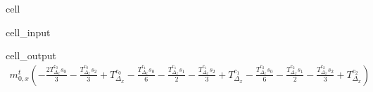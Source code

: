 \documentclass[letterpaper,10pt,english,openany,oneside]{jupyterBook}
\begin{document}
\begin{sphinxuseclass}{cell}
\begin{sphinxVerbatimInput}
\begin{sphinxuseclass}{cell_input}
\end{sphinxuseclass}\end{sphinxVerbatimInput}
\begin{sphinxVerbatimOutput}

\begin{sphinxuseclass}{cell_output}\begin{equation*}
\begin{split}\displaystyle m_{0,x}^{t} \left(- \frac{2 T_{\Delta_{x}}^{c_{0}} s_{0}}{3} - \frac{T_{\Delta_{x}}^{c_{0}} s_{2}}{3} + T_{\Delta_{x}}^{c_{0}} - \frac{T_{\Delta_{x}}^{c_{1}} s_{0}}{6} - \frac{T_{\Delta_{x}}^{c_{1}} s_{1}}{2} - \frac{T_{\Delta_{x}}^{c_{1}} s_{2}}{3} + T_{\Delta_{x}}^{c_{1}} - \frac{T_{\Delta_{x}}^{c_{2}} s_{0}}{6} - \frac{T_{\Delta_{x}}^{c_{2}} s_{1}}{2} - \frac{T_{\Delta_{x}}^{c_{2}} s_{2}}{3} + T_{\Delta_{x}}^{c_{2}}\right)\end{split}
\end{equation*}
\end{sphinxuseclass}\end{sphinxVerbatimOutput}

\end{sphinxuseclass}
\end{document}
